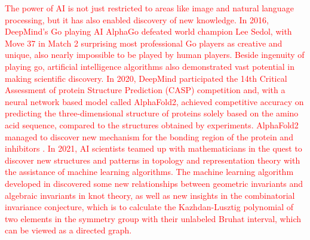 \documentclass[a4paper,onecolumn,11pt]{quantumarticle}
\begin{document}
\textcolor{red}{The power of AI is not just restricted to areas like image and natural language processing, but it has also enabled discovery of new knowledge. In 2016, DeepMind's Go playing AI AlphaGo \cite{AlphaGoDBLP:journals/nature/SilverHMGSDSAPL16} defeated world champion Lee Sedol, with Move 37 in Match 2 surprising most professional Go players as creative and unique, also nearly impossible to be played by human players. Beside ingenuity of playing go, artificial intelligence algorithms also demonstrated vast potential in making scientific discovery. In 2020, DeepMind participated the 14th Critical Assessment of protein Structure Prediction (CASP) competition and, with a neural network based model called AlphaFold2, achieved competitive accuracy on predicting the three-dimensional structure of proteins solely based on the amino acid sequence, compared to the structures obtained by experiments. AlphaFold2 managed to discover new mechanism for the bonding region of the protein and inhibitors \cite{alphafold2Jumper2021-lw}. In 2021, AI scientists teamed up with mathematicians in the quest to discover new structures and patterns in topology and representation theory with the assistance of machine learning algorithms. The machine learning algorithm developed in \cite{Davies2021-xh} discovered some new relationships between geometric invariants and algebraic invariants in knot theory, as well as new insights in the combinatorial invariance conjecture, which is to calculate the Kazhdan-Lusztig polynomial of two elements in the symmetry group with their unlabeled Bruhat interval, which can be viewed as a directed graph.}
\end{document}
